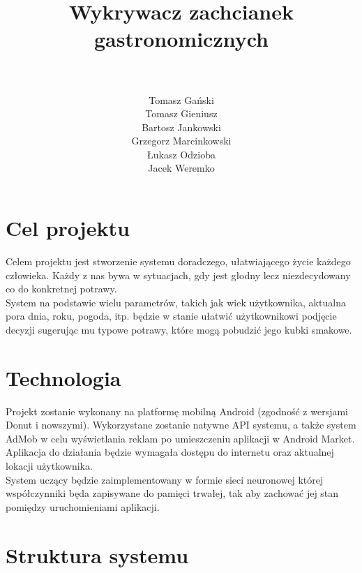 \documentclass[a4paper,twoside,11pt]{article}
\author{\\ ~ \\ Tomasz Gański \\
Tomasz Gieniusz \\
Bartosz Jankowski\\
Grzegorz Marcinkowski\\
Łukasz Odzioba\\
Jacek Weremko}
\title{\LARGE Wykrywacz zachcianek gastronomicznych}
\begin{document}


\tableofcontents

\newpage

\section{Cel projektu}
Celem projektu jest stworzenie systemu doradczego, ułatwiającego życie każdego człowieka. Każdy z nas bywa w sytuacjach, gdy jest głodny lecz niezdecydowany co do konkretnej potrawy. \\ 

System na podstawie wielu parametrów, takich jak wiek użytkownika, aktualna pora dnia, roku, pogoda, itp. będzie w stanie ułatwić użytkownikowi podjęcie decyzji sugerując mu typowe potrawy, które mogą pobudzić jego kubki smakowe.

\section{Technologia}
Projekt zostanie wykonany na platformę mobilną Android (zgodność z wersjami Donut i nowszymi). Wykorzystane zostanie natywne API systemu, a także system AdMob w celu wyświetlania reklam po umieszczeniu aplikacji w Android Market. \\

Aplikacja do działania będzie wymagała dostępu do internetu oraz aktualnej lokacji użytkownika. \\

System uczący będzie zaimplementowany w formie sieci neuronowej której współczynniki będa zapisywane do pamięci trwałej, tak aby zachować jej stan pomiędzy uruchomieniami aplikacji.

\section{Struktura systemu}
\end{document}
